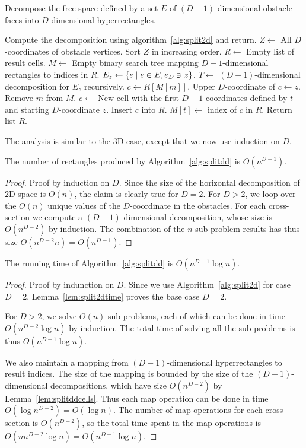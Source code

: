 \documentclass[english,gradu]{tktltiki2018}
\begin{document}
\begin{alg}\label{alg:splitdd}
Decompose the free space defined by a set $E$ of $(D-1)$-dimensional obstacle faces into $D$-dimensional hyperrectangles.
\begin{algorithmic}
	\State Compute the decomposition using algorithm~\ref{alg:split2d} and return.
\EndIf
\State $Z\gets$ All $D$-coordinates of obstacle vertices.
\State Sort $Z$ in increasing order.
\State $R\gets$ Empty list of result cells.
\State $M\gets$ Empty binary search tree mapping $D-1$-dimensional rectangles to indices in $R$.
	\State $E_z\gets\left\{e \mid e\in E, e_D\ni z\right\}$.
	\State $T\gets$ $(D-1)$-dimensional decomposition for $E_z$ recursively.
		\State $c\gets R[M[m]]$.
		\State Upper $D$-coordinate of $c\gets z$.
		\State Remove $m$ from $M$.
	\EndFor
		\State $c\gets$ New cell with the first $D-1$ coordinates defined by $t$ and starting $D$-coordinate $z$.
		\State Insert $c$ into $R$.
		\State $M[t]\gets$ index of $c$ in $R$.
	\EndFor
\EndFor
\State Return list $R$.
\end{algorithmic}
\end{alg}

The analysis is similar to the 3D case, except that we now use induction on $D$.

\begin{lem}\label{lem:splitddcells}The number of rectangles produced by Algorithm~\ref{alg:splitdd} is $O(n^{D-1})$.\end{lem}
\begin{proof}
Proof by induction on $D$.
Since the size of the horizontal decomposition of 2D space is $O(n)$, the claim is clearly true for $D=2$.
For $D>2$, we loop over the $O(n)$ unique values of the $D$-coordinate in the obstacles.
For each cross-section we compute a $(D-1)$-dimensional decomposition, whose size is $O(n^{D-2})$ by induction.
The combination of the $n$ sub-problem results has thus size $O(n^{D-2}n)=O(n^{D-1})$.
\end{proof}

\begin{lem}The running time of Algorithm~\ref{alg:splitdd} is $O(n^{D-1}\log n)$.\end{lem}
\begin{proof}
Proof by indunction on $D$.
Since we use Algorithm~\ref{alg:split2d} for case $D=2$, Lemma~\ref{lem:split2dtime} proves the base case $D=2$.

For $D>2$, we solve $O(n)$ sub-problems, each of which can be done in time $O(n^{D-2}\log n)$ by induction.
The total time of solving all the sub-problems is thus $O(n^{D-1}\log n)$.

We also maintain a mapping from $(D-1)$-dimensional hyperrectangles to result indices.
The size of the mapping is bounded by the size of the $(D-1)$-dimensional decompositions, which have size $O(n^{D-2})$ by Lemma~\ref{lem:splitddcells}.
Thus each map operation can be done in time $O(\log{n^{D-2}})=O(\log n)$.
The number of map operations for each cross-section is $O(n^{D-2})$, so the total time spent in the map operations is $O(nn^{D-2}\log n)=O(n^{D-1}\log n)$.
\end{proof}
\end{document}
